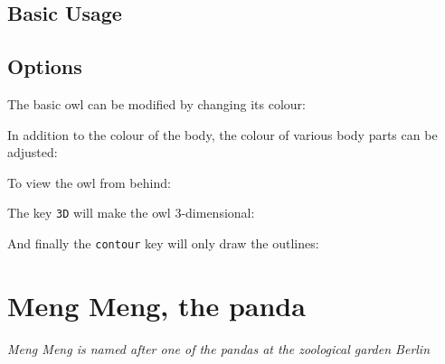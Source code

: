 \documentclass[parskip=half]{scrartcl}
\begin{document}
\subsection{Basic Usage}

\begin{tcblisting}{}
\owl
\end{tcblisting}

\subsection{Options}

The basic owl can be modified by changing its colour:
\begin{tcblisting}{}
\owl[body=blue]
\end{tcblisting}

In addition to the colour of the body, the colour of various body parts can be adjusted:
\begin{tcblisting}{}
\owl[eye=red]
\end{tcblisting}
\begin{tcblisting}{}
\owl[pupil=red]
\end{tcblisting}
\begin{tcblisting}{}
\owl[bill=red]
\end{tcblisting}
\begin{tcblisting}{}
\owl[feet=red]
\end{tcblisting}

To view the owl from behind:
\begin{tcblisting}{}
\owl[back]
\end{tcblisting}

The key \lstinline|3D| will make the owl 3-dimensional:
\begin{tcblisting}{}
\owl[3D]
\end{tcblisting}

And finally the \lstinline|contour| key will only draw the outlines:
\begin{tcblisting}{}
\owl[contour=black]
\end{tcblisting}

%
%
\clearpage
\section[Panda]{Meng Meng, the panda}

\emph{Meng Meng is named after one of the pandas at the zoological garden Berlin}
\end{document}
